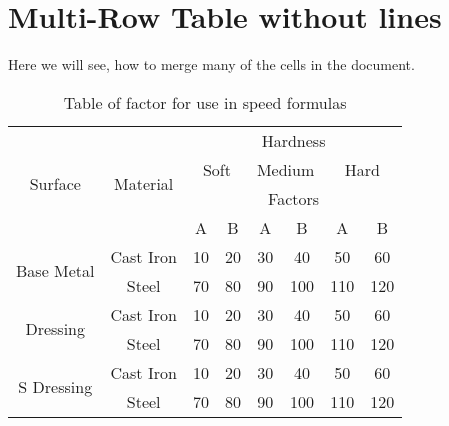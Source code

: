 \documentclass{article}
\begin{document}
	
	\section{Multi-Row Table without lines}
     Here we will see, how to merge many of the cells in the document.
     
     
		\begin{table}[h]
			\begin{tabular}{cccccccc}
		  
\multirow{4}{*}{Surface}       & \multirow{4}{*}{Material} & \multicolumn{6}{c}{Hardness}   \\   
		                                    &                                 & \multicolumn{2}{c}{Soft} & \multicolumn{2}{c}{Medium} & \multicolumn{2}{c}{Hard}  \\ 
		                                    &                                 & \multicolumn{6}{c}{Factors}                                                                        \\  
		                                    &                                 &      A      &   B         &     A       &    B        &     A      &   B    \\     
\multirow{2}{*}{Base Metal}  &		  Cast Iron           &      10     &   20       &   30       &    40      &    50     &     60  \\   
		                                    &           Steel              &      70     &   80       &   90       &   100     &   110      &   120    \\  
\multirow{2}{*}{Dressing}      & 		 Cast Iron          &       10     &     20     &    30      &     40    &    50      &  60     \\   
		                                    &            Steel             &       70    &     80     &      90    &    100     &     110   &   120    \\  
\multirow{2}{*}{S Dressing}  & 		 Cast Iron          &       10     &       20   &    30      &    40      &     50    &   60    \\	 
                                            &            Steel             &      70      &     80     &     90     &      100  &   110     &   120    \\                 
		  
		    \end{tabular}
		\caption{Table of factor for use in speed formulas}	
		\end{table}	
	
\end{document}
